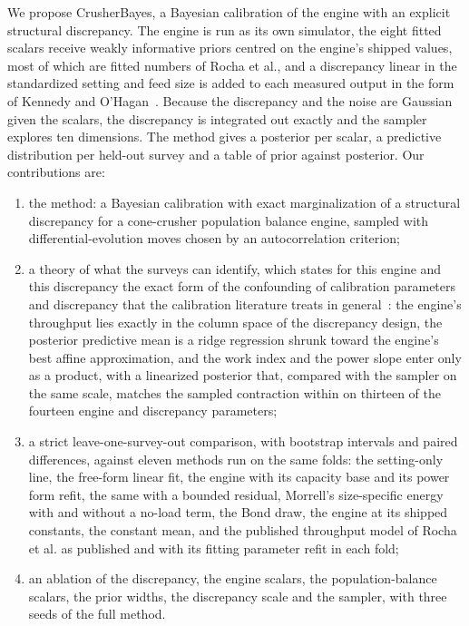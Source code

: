 \documentclass[journal]{IEEEtran}
\begin{document}
We propose CrusherBayes, a Bayesian calibration of the engine with an explicit structural discrepancy. The engine is run
as its own simulator, the eight fitted scalars receive weakly informative priors centred on the engine's shipped values,
most of which are fitted numbers of Rocha et al., and a discrepancy linear in the standardized setting and feed size is added to each measured output in the form of
Kennedy and O'Hagan~\cite{ko}. Because the discrepancy and the noise are Gaussian given the scalars, the discrepancy is
integrated out exactly and the sampler explores ten dimensions. The method gives a posterior per scalar, a predictive
distribution per held-out survey and a table of prior against posterior. Our contributions are:
\begin{enumerate}
\item the method: a Bayesian calibration with exact marginalization of a structural discrepancy for a cone-crusher
population balance engine, sampled with differential-evolution moves chosen by an autocorrelation criterion;
\item a theory of what the surveys can identify, which states for this engine and this discrepancy the exact form of the
confounding of calibration parameters and discrepancy that the calibration literature treats in
general~\cite{brynj,arendt,plumlee}: the engine's throughput lies exactly in the column space of the
discrepancy design, the posterior predictive mean is a ridge regression shrunk toward the engine's best affine
approximation, and the work index and the power slope enter only as a product, with a linearized posterior that,
compared with the sampler on the same scale, matches the sampled contraction within \thLapMaxDevRest{} on thirteen of the
fourteen engine and discrepancy parameters;
\item a strict leave-one-survey-out comparison, with bootstrap intervals and paired differences, against eleven methods run
on the same folds: the setting-only line, the free-form linear fit, the engine with its capacity base and its power form
refit, the same with a bounded residual, Morrell's size-specific energy with and without a no-load term, the Bond draw,
the engine at its shipped constants, the constant mean, and the published throughput model of Rocha et al. as published
and with its fitting parameter refit in each fold;
\item an ablation of the discrepancy, the engine scalars, the population-balance scalars, the prior widths, the
discrepancy scale and the sampler, with three seeds of the full method.
\end{enumerate}
\end{document}
